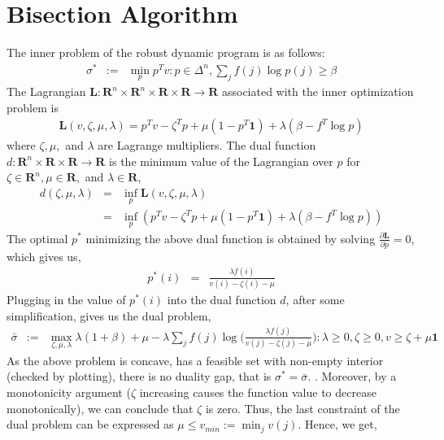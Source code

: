 \section{Bisection Algorithm} \label{section:bisection}

The inner problem of the robust dynamic program is as follows: 
\begin{eqnarray*}
\sigma^* &:=& \min_p p^Tv : p \in \Delta^n, \sum_j f(j)\log p(j) \geq \beta
\end{eqnarray*}
The Lagrangian $\textbf{L}: \textbf{R}^n \times \textbf{R}^n \times \textbf{R} \times \textbf{R} \rightarrow \textbf{R}$ associated with the inner optimization problem is 
\begin{eqnarray*}
\textbf{L}(v, \zeta, \mu, \lambda) = p^Tv - \zeta^Tp + \mu(1 - p^T\textbf{1}) + \lambda(\beta - f^T\log p)
\end{eqnarray*}
where $\zeta, \mu,$ and $\lambda$ are Lagrange multipliers. The dual function $d: \textbf{R}^n \times \textbf{R} \times \textbf{R} \rightarrow \textbf{R}$ is the minimum value of the Lagrangian over $p$ for $\zeta \in \textbf{R}^n, \mu \in \textbf{R},$ and $\lambda \in \textbf{R}$,
\begin{eqnarray*}
d(\zeta, \mu, \lambda) &=& \inf_p \textbf{L}(v, \zeta, \mu, \lambda) \\
&=& \inf_p(p^Tv - \zeta^Tp + \mu(1 - p^T\textbf{1}) + \lambda(\beta - f^T\log p))
\end{eqnarray*}
The optimal $p^*$ minimizing the above dual function is obtained by solving $\frac{\partial \textbf{L}}{\partial p} = 0$, which gives us,
\begin{eqnarray*}
p^*(i) &=& \frac{\lambda f(i)}{v(i) - \zeta(i) - \mu}
\end{eqnarray*}
Plugging in the value of $p^*(i)$ into the dual function $d$, after some simplification, gives us the dual problem,
\begin{eqnarray*}
\bar{\sigma} &:=& \max_{\zeta, \mu, \lambda} \lambda(1 + \beta) + \mu - \lambda \sum_{j}f(j) \log\bigg(\frac{\lambda f(j)}{v(j) - \zeta(j) - \mu}\bigg) : \lambda \geq 0, \zeta \geq 0, v \geq \zeta + \mu\textbf{1} 
\end{eqnarray*}
As the above problem is concave, has a feasible set with non-empty interior (checked by plotting), there is no duality gap, that is $\sigma^* = \bar{\sigma}$. . Moreover, by a monotonicity argument ($\zeta$ increasing causes the function value to decrease monotonically), we can conclude that $\zeta$ is zero. Thus, the last constraint of the dual problem can be expressed as $\mu \leq v_{min} := \min_j v(j)$. Hence, we get,
